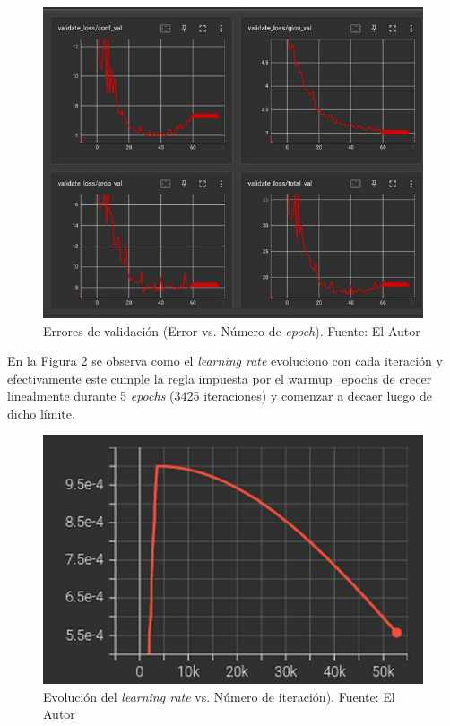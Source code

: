 \begin{figure}[H]
    \centering
    \includegraphics[scale=0.6]{Recursos/validation_loss_result.jpg}
    \caption[Errores de validación (Error vs. Número de \textit{epoch}).]{Errores de validación (Error vs. Número de \textit{epoch}). {\footnotesize Fuente: El Autor}}
    \label{validation_result}
\end{figure}
En la Figura \ref{learning_rate_result} se observa como el \textit{learning rate} evoluciono con cada iteración y efectivamente este cumple la regla impuesta por el warmup\_epochs de crecer linealmente durante 5 \textit{epochs} (3425 iteraciones) y comenzar a decaer luego de dicho límite.
\begin{figure}[H]
    \centering
    \includegraphics[scale=0.6]{Recursos/learning_rate_evolution_result.jpg}
    \caption[Evolución del \textit{learning rate} vs. Número de iteración).]{Evolución del \textit{learning rate} vs. Número de iteración). {\footnotesize Fuente: El Autor}}
    \label{learning_rate_result}
\end{figure}
